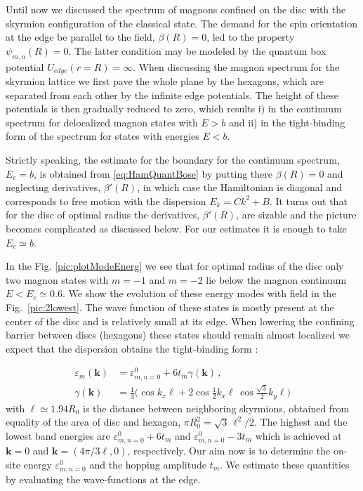 \documentclass[aps,prb,twocolumn,superscriptaddress,nobalancelastpage]{revtex4-1}
\begin{document}
Until now we discussed the spectrum of magnons confined on the disc with the skyrmion configuration of the classical state. The demand for the spin orientation at the edge be parallel to the field, $\beta(R) =0$, led to the property $\psi_{m,n}(R)=0$. The latter condition may be modeled by the quantum box potential $U_{edge}(r =R)=\infty$. When discussing   the magnon spectrum for the skyrmion lattice we first pave the whole plane by the hexagons, which are separated from each other by the infinite edge potentials. The height of these potentials is then gradually reduced to zero, which results i) in the continuum spectrum for delocalized magnon states with $E>b$ and ii) in the tight-binding form of the spectrum for states with energies $E<b$. 

Strictly speaking, the estimate for the boundary for the continuum spectrum, $E_{c}=b$, is obtained from \eqref{eq:HamQuantBose} by putting there $\beta(R)=0$ and neglecting derivatives,  $\beta'(R)$, in which case the Hamiltonian is diagonal and corresponds to free motion with the dispersion $E_{k} = C k^{2} +B$. It turns out that for the disc of optimal radius the derivatives, $\beta'(R)$, are sizable and the picture becomes complicated as discussed below. For our estimates it is enough to take  $E_{c} \simeq b$.   

In the Fig. \ref{pic:plotModeEnerg} we see that for optimal radius of the disc only two magnon states with $m=-1$ and $m=-2$ lie below the magnon continuum $E < E_{c} \simeq 0.6$. 
We show the evolution of these energy modes with field in the Fig.\ \ref{pic:2lowest}.
The wave function of these states is mostly present at the center of the disc and is relatively small at its edge. When lowering the confining barrier between discs (hexagons) these states should remain almost localized we expect that the dispersion obtains the tight-binding form : 

\begin{equation}
\begin{aligned}
    \varepsilon_{m} (\mathbf{k}) & = \varepsilon_{m,n=0}^0 
 + 6 t_{m} \gamma(\mathbf{k}) \,, \\ 
 \gamma(\mathbf{k}) & = \tfrac 13
 \big( \cos  k_{x}\ell 
 + 2\cos  \tfrac12 {k_{x}\ell}  \, \cos  \tfrac{\sqrt{3}}2 k_{y} \ell   \big)   
\end{aligned}
\label{eq:dispersionOfEnergy}
\end{equation}
with $\ell \simeq 1.94 R_{0}$ is the distance between neighboring skyrmions, obtained from equality of the area of  disc and hexagon, $\pi R_{0}^{2} = \sqrt{3}\,\ell^{2}/2$. The highest and the lowest band energies are $ \varepsilon_{m,n=0}^0 + 6t_{m}$ and  $ \varepsilon_{m,n=0}^0 -3 t_{m}$  which is  achieved at $\mathbf{k}=0$ and $\mathbf{k} = (4\pi/3\ell,0)$, respectively.  Our aim now is to determine the on-site energy $\varepsilon_{m,n=0}^0$ and the hopping amplitude  $t_{m}$. We estimate these quantities by evaluating the wave-functions at the edge. 
\end{document}
